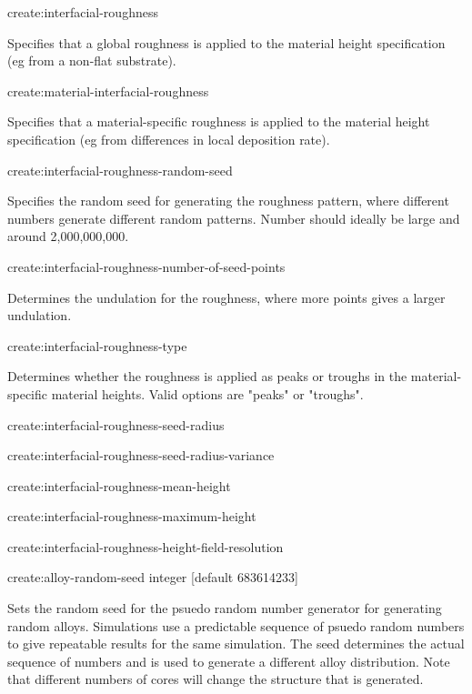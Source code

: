{\zicf create:interfacial-roughness} Specifies that a global roughness is applied to the material height specification (eg from a non-flat substrate).

{\zicf create:material-interfacial-roughness} Specifies that a material-specific roughness is applied to the material height specification (eg from differences in local deposition rate).

{\zicf create:interfacial-roughness-random-seed} Specifies the random seed for generating the roughness pattern, where different numbers generate different random patterns. Number should ideally be large and around 2,000,000,000.

{\zicf create:interfacial-roughness-number-of-seed-points} Determines the undulation for the roughness, where more points gives a larger undulation.

{\zicf create:interfacial-roughness-type} Determines whether the roughness is applied as peaks or troughs in the material-specific material heights. Valid options are "peaks" or "troughs".

{\zicf create:interfacial-roughness-seed-radius}

{\zicf create:interfacial-roughness-seed-radius-variance}

{\zicf create:interfacial-roughness-mean-height}

{\zicf create:interfacial-roughness-maximum-height}

{\zicf create:interfacial-roughness-height-field-resolution}

{\zicf create:alloy-random-seed integer [default 683614233]} Sets the random seed for the psuedo random number generator for generating random alloys. Simulations use a predictable sequence of psuedo random numbers to give repeatable results for the same simulation. The seed determines the actual sequence of numbers and is used to generate a different alloy distribution. Note that different numbers of cores will change the structure that is generated.

